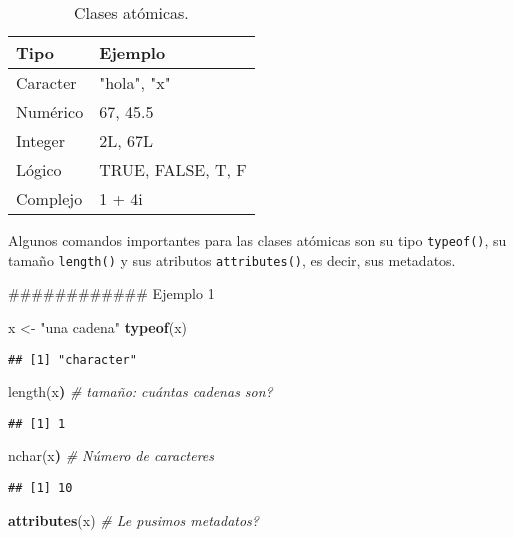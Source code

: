\documentclass[]{article}
\newenvironment{Shaded}{\begin{snugshade}}{\end{snugshade}}
\newcommand{\KeywordTok}[1]{\textcolor[rgb]{0.13,0.29,0.53}{\textbf{{#1}}}}
\newcommand{\StringTok}[1]{\textcolor[rgb]{0.31,0.60,0.02}{{#1}}}
\newcommand{\CommentTok}[1]{\textcolor[rgb]{0.56,0.35,0.01}{\textit{{#1}}}}
\newcommand{\ErrorTok}[1]{\textbf{{#1}}}
\newcommand{\NormalTok}[1]{{#1}}
\begin{document}
\begin{table}[ht]
\centering
\begin{tabular}{p{3cm}p{5cm}}
  \hline
Tipo & Ejemplo \\ 
  \hline
Caracter & "hola", "x" \\ 
Numérico & 67, 45.5 \\
Integer & 2L, 67L \\
Lógico & TRUE, FALSE, T, F \\
Complejo & 1 + 4i\\
   \hline
\end{tabular}
\caption{Clases atómicas.}
\end{table}

Algunos comandos importantes para las clases atómicas son su tipo
\texttt{typeof()}, su tamaño \texttt{length()} y sus atributos
\texttt{attributes()}, es decir, sus metadatos.

\begin{Shaded}
\begin{Highlighting}[]
\NormalTok{############ Ejemplo 1}

\NormalTok{x <-}\StringTok{ "una cadena"}
\KeywordTok{typeof}\NormalTok{(x)}
\end{Highlighting}
\end{Shaded}

\begin{verbatim}
## [1] "character"
\end{verbatim}

\begin{Shaded}
\begin{Highlighting}[]
\NormalTok{length(x}\ErrorTok{)} \CommentTok{# tamaño: cuántas cadenas son?}
\end{Highlighting}
\end{Shaded}

\begin{verbatim}
## [1] 1
\end{verbatim}

\begin{Shaded}
\begin{Highlighting}[]
\NormalTok{nchar(x}\ErrorTok{)} \CommentTok{# Número de caracteres}
\end{Highlighting}
\end{Shaded}

\begin{verbatim}
## [1] 10
\end{verbatim}

\begin{Shaded}
\begin{Highlighting}[]
\KeywordTok{attributes}\NormalTok{(x) }\CommentTok{# Le pusimos metadatos?}
\end{Highlighting}
\end{Shaded}
\end{document}
